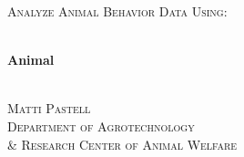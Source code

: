 \begin{titlepage}



\vspace*{1cm}


\noindent \textsc{\Large Analyze Animal Behavior Data Using:}\\[0.1cm]
\HRule \\[0.2cm]
\begin{center}
{ \huge \bfseries Animal}\\[0.4cm]
\HRule \\[5cm]
\end{center}


\noindent \textsc{\Large Matti Pastell}\\[0.5cm]
\noindent \textsc{\Large Department of Agrotechnology \\[0.1cm] \& Research
  Center of Animal Welfare}\\[0.5cm]




\end{titlepage}



